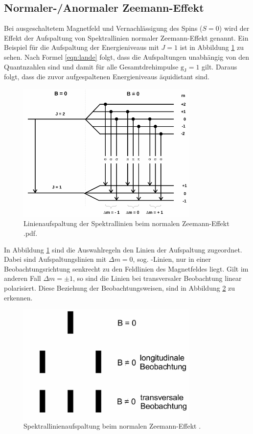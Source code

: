 \subsection{Normaler-/Anormaler Zeemann-Effekt}
\label{sec:Zeemann}
Bei ausgeschaltetem Magnetfeld und Vernachlässigung des Spins ($S = \num{0}$) wird
der Effekt der Aufspaltung von Spektrallinien normaler Zeemann-Effekt genannt.
Ein Beispiel für die Aufspaltung der Energieniveaus mit $J = 1$ ist in Abbildung
\ref{abb:normal} zu sehen. Nach Formel \ref{eqn:lande} folgt, dass die Aufspaltungen
unabhängig von den Quantnzahlen sind und damit für alle Gesamtdrehimpulse $\text{g}_\text{J} = 1$
gilt. Daraus folgt, dass die zuvor aufgespaltenen Energieniveaus äquidistant sind.
\begin{figure}[htb]
  \centering
  \includegraphics[width=0.8\textwidth]{images/V27_3.pdf}
  \caption{Linienaufspaltung der Spektrallinien beim normalen Zeemann-Effekt
  \cite{anleitung}.pdf.}
  \label{abb:normal}
\end{figure}
In Abbildung \ref{abb:normal} sind die Auswahlregeln den Linien der Aufspaltung
zugeordnet.
Dabei sind Aufspaltungslinien mit $\Delta m = \num{0}$, sog. \pi-Linien, nur in
einer Beobachtungsrichtung senkrecht zu den Feldlinien des Magnetfeldes liegt.
Gilt im anderen Fall $\Delta m = \pm 1$, so sind die Linien bei transversaler
Beobachtung linear polarisiert. Diese Beziehung der Beobachtungsweisen, sind
in Abbildung \ref{abb:spektral} zu erkennen.
\begin{figure}[htb]
  \centering
  \includegraphics[width=0.8\textwidth]{images/V27_4.pdf}
  \caption{Spektrallinienaufspaltung beim normalen Zeemann-Effekt \cite{anleitung}.}
  \label{abb:spektral}
\end{figure}


